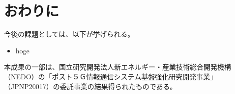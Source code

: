 \documentclass[submit,techrep]{ipsj}
\begin{document}
\section{おわりに}\label{sec:conclusion}


今後の課題としては、以下が挙げられる。
\begin{itemize}
  \item hoge
\end{itemize}



\begin{acknowledgment}
本成果の一部は、国立研究開発法人新エネルギー・産業技術総合開発機構（NEDO）の「ポスト５Ｇ情報通信システム基盤強化研究開発事業」（JPNP20017）の委託事業の結果得られたものである。
\end{acknowledgment}



\end{document}
